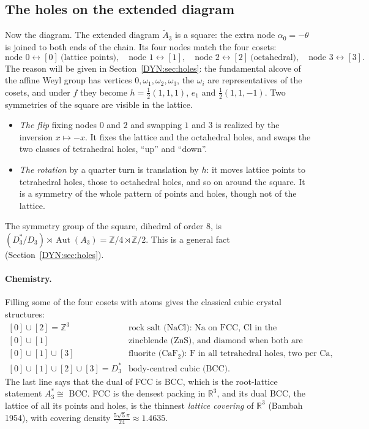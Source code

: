 \documentclass[11pt,openany]{book}
\theoremstyle{plain}
\theoremstyle{definition}
\theoremstyle{remark}
\newcommand{\R}{\mathbb{R}}
\newcommand{\Z}{\mathbb{Z}}
\begin{document}
\subsection*{The holes on the extended diagram}
Now the diagram. The extended diagram $\tilde A_3$ is a square: the extra node $\alpha_0=-\theta$ is
joined to both ends of the chain. Its four nodes match the four cosets:
\[
  \text{node }0\leftrightarrow[0]\ \text{(lattice points)},\quad
  \text{node }1\leftrightarrow[1],\quad \text{node }2\leftrightarrow[2]\ \text{(octahedral)},\quad
  \text{node }3\leftrightarrow[3].
\]
The reason will be given in Section~\ref{DYN:sec:holes}: the fundamental alcove of the affine Weyl group
has vertices $0,\omega_1,\omega_2,\omega_3$, the $\omega_i$ are representatives of the cosets, and under $f$
they become $h=\frac12(1,1,1)$, $e_1$ and $\frac12(1,1,-1)$. Two symmetries of the square are visible in the lattice.
\begin{itemize}
\item \emph{The flip} fixing nodes $0$ and $2$ and swapping $1$ and $3$ is realized by the inversion $x\mapsto-x$. It
  fixes the lattice and the octahedral holes, and swaps the two classes of tetrahedral holes, ``up'' and
  ``down''.
\item \emph{The rotation} by a quarter turn is translation by $h$: it moves lattice points to
  tetrahedral holes, those to octahedral holes, and so on around the square. It is a symmetry of the whole
  pattern of points and holes, though not of the lattice.
\end{itemize}
The symmetry group of the square, dihedral of order $8$, is $(D_3^*/D_3)\rtimes\operatorname{Aut}(A_3)
=\Z/4\rtimes\Z/2$. This is a general fact (Section~\ref{DYN:sec:holes}).

\paragraph{Chemistry.} Filling some of the four cosets with atoms gives the classical cubic crystal
structures:
\[
  \begin{array}{ll}
  [0]\cup[2]=\Z^3 & \text{rock salt (NaCl): Na on FCC, Cl in the octahedral holes,}\\
  {}[0]\cup[1] & \text{zincblende (ZnS), and diamond when both are carbon,}\\
  {}[0]\cup[1]\cup[3] & \text{fluorite (CaF$_2$): F in all tetrahedral holes, two per Ca,}\\
  {}[0]\cup[1]\cup[2]\cup[3]=D_3^* & \text{body-centred cubic (BCC).}
  \end{array}
\]
The last line says that the dual of FCC is BCC, which is the root-lattice statement $A_3^*\cong$ BCC.
FCC is the densest packing in $\R^3$, and its dual BCC, the lattice of all its points and holes, is the
thinnest \emph{lattice covering} of $\R^3$ (Bambah 1954), with covering density
$\frac{5\sqrt5\pi}{24}\approx1.4635$.
\end{document}
